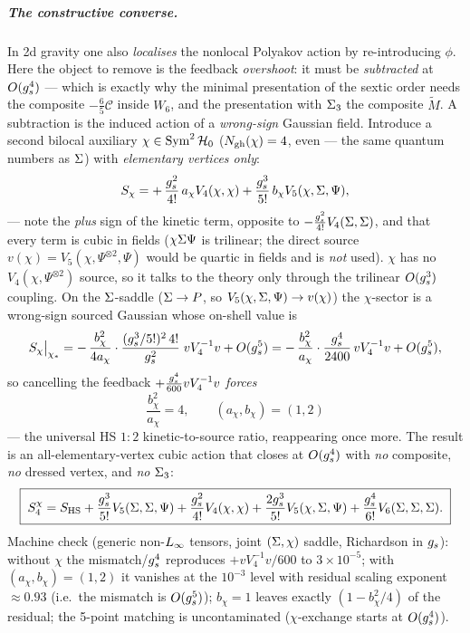 \subparagraph{The constructive converse.} In 2d gravity one also \emph{localises} the
nonlocal Polyakov action by re-introducing $\phi$. Here the object to remove is the
feedback \emph{overshoot}: it must be \emph{subtracted} at $O(g_s^4)$ --- which is
exactly why the minimal presentation of the sextic order needs the composite $-\tfrac65\mathcal C$ inside $W_6$, and
the presentation with $\Sigma_3$ the composite $\tilde M$. A subtraction is the induced action of a
\emph{wrong-sign} Gaussian field. Introduce a second bilocal auxiliary
$\chi\in\operatorname{Sym}^2\mathcal{H}_0$ ($N_{\text{gh}}(\chi)=4$, even --- the same quantum numbers as $\Sigma$)
with \emph{elementary vertices only}:
\begin{equation}
	S_\chi
	= +\,\frac{g_s^2}{4!}\,a_\chi V_4(\chi,\chi)
	+ \frac{g_s^3}{5!}\,b_\chi V_5(\chi,\Sigma,\Psi),
	\label{ped:eq:Schi}
\end{equation}
--- note the \emph{plus} sign of the kinetic term, opposite to
$-\tfrac{g_s^2}{4!}V_4(\Sigma,\Sigma)$, and that every term is cubic in fields
($\chi\Sigma\Psi$ is trilinear; the direct source $v(\chi)=V_5(\chi,\Psi^{\otimes2},\Psi)$
would be quartic in fields and is \emph{not} used). $\chi$ has no
$V_4(\chi,\Psi^{\otimes2})$ source, so it talks to the theory only through the
trilinear $O(g_s^3)$ coupling. On the $\Sigma$-saddle ($\Sigma\to P$, so
$V_5(\chi,\Sigma,\Psi)\to v(\chi)$) the $\chi$-sector is a wrong-sign sourced Gaussian
whose on-shell value is
\begin{equation}
	S_\chi\big|_{\chi_*}
	= -\,\frac{b_\chi^2}{4a_\chi}\cdot\frac{(g_s^3/5!)^2\,4!}{g_s^2}\;vV_4^{-1}v+O(g_s^5)
	= -\,\frac{b_\chi^2}{a_\chi}\cdot\frac{g_s^4}{2400}\,vV_4^{-1}v+O(g_s^5),
	\label{ped:eq:chivalue}
\end{equation}
so cancelling the feedback $+\tfrac{g_s^4}{600}vV_4^{-1}v$ \emph{forces}
\begin{equation}
	\boxed{\;\frac{b_\chi^2}{a_\chi}=4,\qquad (a_\chi,b_\chi)=(1,2)\;}
	\label{ped:eq:chiforced}
\end{equation}
--- the universal HS $1{:}2$ kinetic-to-source ratio, reappearing once more. The result
is an all-elementary-vertex cubic action that closes at $O(g_s^4)$ with \emph{no}
composite, \emph{no} dressed vertex, and \emph{no} $\Sigma_3$:
\begin{equation}
	\boxed{\;
	S^{\chi}_4
	= S_{\rm HS}
	+ \frac{g_s^3}{5!}V_5(\Sigma,\Sigma,\Psi)
	+ \frac{g_s^2}{4!}V_4(\chi,\chi)
	+ \frac{2g_s^3}{5!}V_5(\chi,\Sigma,\Psi)
	+ \frac{g_s^4}{6!}V_6(\Sigma,\Sigma,\Sigma).
	\;}
	\label{ped:eq:S4chi}
\end{equation}
Machine check (generic non-$L_\infty$ tensors, joint $(\Sigma,\chi)$ saddle, Richardson in
$g_s$): without $\chi$ the mismatch/$g_s^4$ reproduces $+vV_4^{-1}v/600$ to
$3\times10^{-5}$; with $(a_\chi,b_\chi)=(1,2)$ it vanishes at the $10^{-3}$ level with
residual scaling exponent $\approx0.93$ (i.e.\ the mismatch is $O(g_s^5)$); $b_\chi=1$
leaves exactly $(1-b_\chi^2/4)$ of the residual; the 5-point matching is uncontaminated
($\chi$-exchange starts at $O(g_s^4)$).

